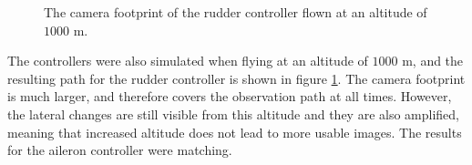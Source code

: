 \begin{figure}[]
    \centering
    \caption{The camera footprint of the rudder controller flown at an altitude of $1000$ m.}
	\label{fig:ratc_thousand}
\end{figure}

The controllers were also simulated when flying at an altitude of $1000$ m, and the resulting path for the rudder controller is shown in figure \ref{fig:ratc_thousand}. The camera footprint is much larger, and therefore covers the observation path at all times. However, the lateral changes are still visible from this altitude and they are also amplified, meaning that increased altitude does not lead to more usable images. The results for the aileron controller were matching.